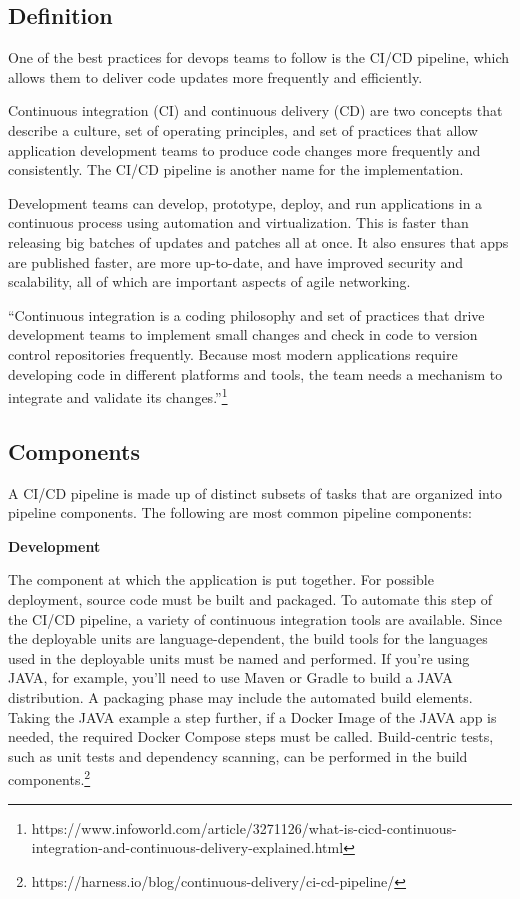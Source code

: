 \subsection{Definition}
%
One of the best practices for devops teams to follow is the CI/CD pipeline, which allows them to deliver code updates more frequently and efficiently.


Continuous integration (CI) and continuous delivery (CD) are two concepts that describe a culture, set of operating principles, and set of practices that allow application development teams to produce code changes more frequently and consistently. The CI/CD pipeline is another name for the implementation.

Development teams can develop, prototype, deploy, and run applications in a continuous process using automation and virtualization. This is faster than releasing big batches of updates and patches all at once. It also ensures that apps are published faster, are more up-to-date, and have improved security and scalability, all of which are important aspects of agile networking.

“Continuous integration is a coding philosophy and set of practices that drive development teams to implement small changes and check in code to version control repositories frequently. Because most modern applications require developing code in different platforms and tools, the team needs a mechanism to integrate and validate its changes.”\footnote{https://www.infoworld.com/article/3271126/what-is-cicd-continuous-integration-and-continuous-delivery-explained.html}

%
\subsection{Components}
%
A CI/CD pipeline is made up of distinct subsets of tasks that are organized into pipeline components. The following are most common pipeline components:

\textbf{Development}


The component at which the application is put together. For possible deployment, source code must be built and packaged. To automate this step of the CI/CD pipeline, a variety of continuous integration tools are available. Since the deployable units are language-dependent, the build tools for the languages used in the deployable units must be named and performed. If you're using JAVA, for example, you'll need to use Maven or Gradle to build a JAVA distribution. A packaging phase may include the automated build elements. Taking the JAVA example a step further, if a Docker Image of the JAVA app is needed, the required Docker Compose steps must be called. Build-centric tests, such as unit tests and dependency scanning, can be performed in the build components.\footnote{https://harness.io/blog/continuous-delivery/ci-cd-pipeline/}


